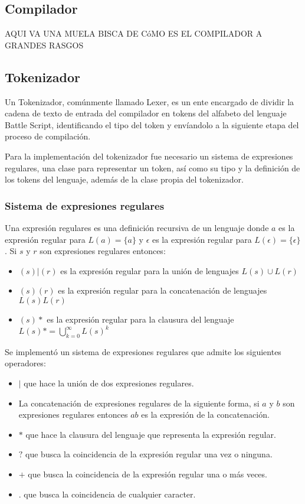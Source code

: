 \subsection{Compilador}

AQUI VA UNA MUELA BISCA DE CóMO ES EL COMPILADOR A GRANDES RASGOS

\subsection{Tokenizador}

Un Tokenizador, comúnmente llamado Lexer, es un ente encargado de dividir la cadena de texto de entrada del compilador en tokens del alfabeto del lenguaje Battle Script, identificando el tipo del token y envíandolo a la siguiente etapa del proceso de compilación.

Para la implementación del tokenizador fue necesario un sistema de expresiones regulares, una clase para representar un token, así como su tipo y la definición de los tokens del lenguaje, además de la clase propia del tokenizador. 

\subsubsection{Sistema de expresiones regulares}

Una expresión regulares es una definición recursiva de un lenguaje donde $a$ es la expresión regular para $L(a) = \{a\}$ y $\epsilon$ es la expresión regular para $L(\epsilon) = \{\epsilon\}$. Si $s$ y $r$ son expresiones regulares entonces:

\begin{itemize}
    \item $(s)|(r)$ es la expresión regular para la unión de lenguajes $L(s) \cup L(r)$
    \item $(s)(r)$ es la expresión regular para la concatenación de lenguajes $L(s)L(r)$
    \item $(s)*$ es la expresión regular para la clausura del lenguaje $L(s)* = \bigcup\limits_{k=0}^{\infty} L(s)^k$
\end{itemize}

Se implementó un sistema de expresiones regulares que admite los siguientes operadores:

\begin{itemize}
    \item $|$ que hace la unión de dos expresiones regulares.
    \item La concatenación de expresiones regulares de la siguiente forma, si $a$ y $b$ son expresiones regulares entonces $ab$ es la expresión de la concatenación.
    \item $*$ que hace la clausura del lenguaje que representa la expresión regular.
    \item $?$ que busca la coincidencia de la expresión regular una vez o ninguna.
    \item $+$ que busca la coincidencia de la expresión regular una o más veces.
    \item $.$ que busca la coincidencia de cualquier caracter.
\end{itemize}



